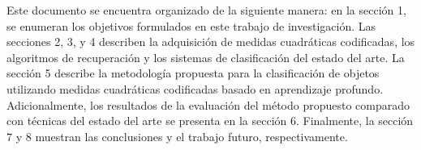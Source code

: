 Este documento se encuentra organizado de la siguiente manera: en la sección 1, se enumeran los objetivos formulados en este trabajo de investigación. Las secciones 2, 3, y 4 describen la adquisición de medidas cuadráticas codificadas, los algoritmos de recuperación y los sistemas de clasificación del estado del arte. La sección 5 describe la metodología propuesta para la clasificación de objetos utilizando medidas cuadráticas codificadas basado en aprendizaje profundo. Adicionalmente, los resultados de la evaluación del método propuesto comparado con técnicas del estado del arte se presenta en la sección 6. Finalmente, la sección 7 y 8 muestran las conclusiones y el trabajo futuro, respectivamente. 


